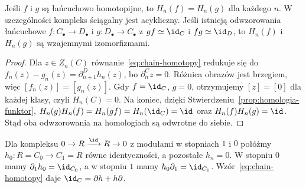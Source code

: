 \begin{twierdzenie}
\label{thm:homotopia-homologia}
Jeśli $f$ i $g$ są łańcuchowo homotopijne,
to $H_n(f)=H_n(g)$ dla każdego $n$.
W szczególności kompleks ściągalny jest
acykliczny. Jeśli istnieją odwzorowania łańcuchowe
$f:C_\bullet\to D_\bullet$ i
$g:D_\bullet\to C_\bullet$ z
$gf\simeq\id_C$ i $fg\simeq\id_D$,
to $H_n(f)$ i $H_n(g)$ są wzajemnymi
izomorfizmami.
\end{twierdzenie}
\begin{proof}
Dla $z\in Z_n(C)$ równanie~\eqref{eq:chain-homotopy}
redukuje się do
$f_n(z)-g_n(z)=\partial^D_{n+1}h_n(z)$,
bo $\partial^C_nz=0$. Różnica obrazów jest
brzegiem, więc $[f_n(z)]=[g_n(z)]$.
Gdy $f=\id_C$, $g=0$, otrzymujemy
$[z]=[0]$ dla każdej klasy, czyli
$H_n(C)=0$.
Na koniec, dzięki Stwierdzeniu~\ref{prop:homologia-funktor},
$H_n(g)H_n(f)=H_n(gf)=H_n(\id_C)=\id$ oraz
$H_n(f)H_n(g)=\id$.
Stąd oba odwzorowania na homologiach są
odwrotne do siebie.
\end{proof}

\begin{przyklad}
Dla kompleksu
$0\to R\xrightarrow{\id}R\to0$
z modułami w stopniach $1$ i $0$
połóżmy $h_0:R=C_0\to C_1=R$
równe identyczności, a pozostałe
$h_n=0$. W stopniu $0$ mamy
$\partial_1h_0=\id_{C_0}$, a w stopniu
$1$ mamy $h_0\partial_1=\id_{C_1}$.
Wzór~\eqref{eq:chain-homotopy}
daje $\id_C=\partial h+h\partial$.
\end{przyklad}

